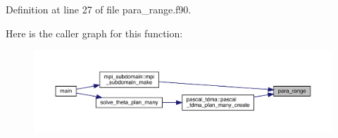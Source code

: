 Definition at line 27 of file para\+\_\+range.\+f90.

Here is the caller graph for this function\+:
\nopagebreak
\begin{figure}[H]
\begin{center}
\leavevmode
\includegraphics[width=350pt]{para__range_8f90_ab75ab386311975aa4ff7cac06798fcd4_icgraph}
\end{center}
\end{figure}
